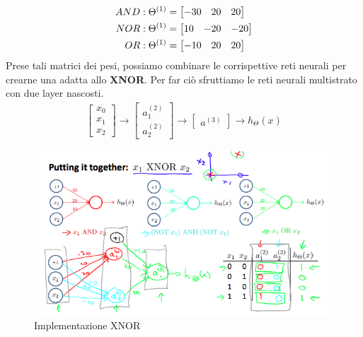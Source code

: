 \begin{esempio}
    \begin{align}AND:\newline\Theta^{(1)} &=\begin{bmatrix}-30 & 20 & 20\end{bmatrix} \nonumber \\ NOR:\newline\Theta^{(1)} &= \begin{bmatrix}10 & -20 & -20\end{bmatrix} \nonumber \\ OR:\newline\Theta^{(1)} &= \begin{bmatrix}-10 & 20 & 20\end{bmatrix} \nonumber \\\end{align}
    Prese tali matrici dei pesi, possiamo combinare le corrispettive reti neurali per crearne una adatta allo \textbf{XNOR}. Per far ciò sfruttiamo le reti neurali multistrato con due layer nascosti.
    \begin{align}\begin{bmatrix}x_0 \nonumber \\ x_1 \nonumber \\ x_2\end{bmatrix} \rightarrow\begin{bmatrix}a_1^{(2)} \nonumber \\ a_2^{(2)} \end{bmatrix} \rightarrow\begin{bmatrix}a^{(3)}\end{bmatrix} \rightarrow h_\Theta(x)\end{align}
    \begin{figure}[H]
        \centering
        \includegraphics[width=1.0\textwidth]{img/rag_zbGqEeaSmhJaoV5QvA_52c04a987dcb692da8979a2198f3d8d7_Screenshot-2016-11-23-10.28.41.png}
        \caption{Implementazione XNOR}
        \label{XORImplementation}
    \end{figure}
\end{esempio}
